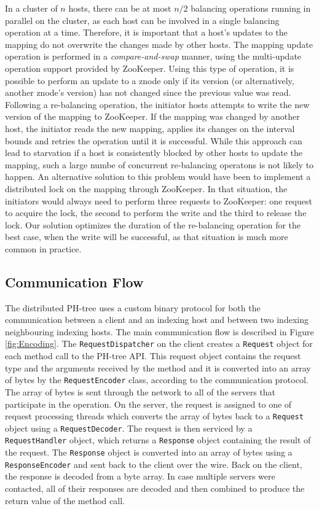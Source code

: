 \documentclass[11pt,a4paper]{globis-book}
\begin{document}
In a cluster of $n$ hosts, there can be at most $n/2$ balancing operations running in parallel on the cluster, as each host can be involved in a single balancing operation at a time. Therefore, it is important that a host's updates to the mapping do not overwrite the changes made by other hosts. The mapping update operation is performed in a \textit{compare-and-swap} manner, using the multi-update operation support provided by ZooKeeper. Using this type of operation, it is possible to perform an update to a znode only if its version (or alternatively, another znode's version) has not changed since the previous value was read. Following a re-balancing operation, the initiator hosts attempts to write the new version of the mapping to ZooKeeper. If the mapping was changed by another host, the initiator reads the new mapping, applies its changes on the interval bounds and retries the operation until it is successful. While this approach can lead to starvation if a host is consistently blocked by other hosts to update the mapping, such a large numbe of concurrent re-balancing operatons is not likely to happen. An alternative solution to this problem would have been to implement a distributed lock on the mapping through ZooKeeper. In that situation, the initiators would always need to perform three requests to ZooKeeper: one request to acquire the lock, the second to perform the write and the third to release the lock. Our solution optimizes the duration of the re-balancing operation for the best case, when the write will be successful, as that situation is much more common in practice. 

\subsection{Communication Flow}

The distributed PH-tree uses a custom binary protocol for both the communication between a client and an indexing host and between two indexing neighbouring indexing hosts. The main communication flow is described in Figure \ref{fig:Encoding}. The \texttt{RequestDispatcher} on the client creates a \texttt{Request} object for each method call to the PH-tree API. This request object contains the request type and the arguments received by the method and it is converted into an array of bytes by the \texttt{RequestEncoder} class, according to the communication protocol. The array of bytes is sent through the network to all of the servers that participate in the operation. On the server, the request is assigned to one of request processing threads which converts the array of bytes back to a \texttt{Request} object using a \texttt{RequestDecoder}. The request is then serviced by a \texttt{RequestHandler} object, which returns a \texttt{Response} object containing the result of the request. The \texttt{Response} object is converted into an array of bytes using a \texttt{ResponseEncoder} and sent back to the client over the wire. Back on the client, the response is decoded from a byte array. In case multiple servers were contacted, all of their responses are decoded and then combined to produce the return value of the method call.
\end{document}
